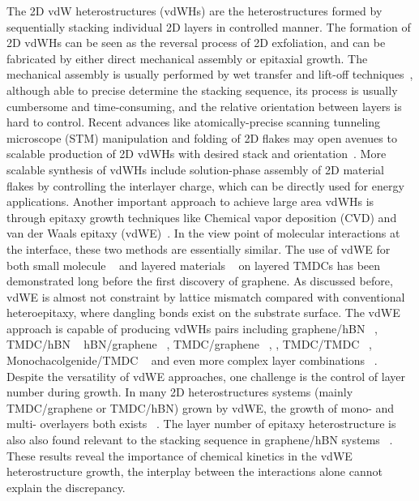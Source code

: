 The 2D vdW heterostructures (vdWHs) are the heterostructures formed by
sequentially stacking individual 2D layers in controlled manner. The
formation of 2D vdWHs can be seen as the reversal process of 2D
exfoliation, and can be fabricated by either direct mechanical
assembly or epitaxial growth.
%
The mechanical assembly is usually performed by wet transfer and
lift-off techniques~\cite{Novoselov_2016_vdW},
although able to precise determine the stacking
sequence, its process is usually cumbersome and time-consuming, and
the relative orientation between layers is hard to
control.
Recent advances like atomically-precise scanning tunneling microscope
(STM) manipulation and folding of 2D flakes may open avenues to
scalable production of 2D vdWHs with desired stack and
orientation~\cite{Chen_2019_STM_graphene}.
%
More scalable synthesis of vdWHs include solution-phase assembly of 2D
material flakes by controlling the interlayer charge, which can be
directly used for energy applications.
%
Another important approach to achieve large area vdWHs is through
epitaxy growth techniques like Chemical vapor deposition (CVD) and
van der Waals epitaxy (vdWE)~\cite{Novoselov_2016_vdW}. In the view point of
molecular interactions at the interface, these two methods are
essentially similar. The use of vdWE for both
small molecule ~\cite{Hara_1989_cupc_mos2_vdwe,Sakurai_1991_c60_mos2} and
layered materials
~\cite{Koma_1985_vdWE,Ueno_1990_vdWE,Ohuchi_1990_MoSe2_SnS2,Parkinson_1991_vdWE}
on layered TMDCs has been demonstrated long before the first discovery
of graphene. As discussed before, vdWE is almost not constraint by lattice mismatch compared with conventional heteroepitaxy,
where dangling bonds exist on the substrate surface.
%
The vdWE approach is capable of producing vdWHs pairs including
graphene/hBN ~\cite{Yang_2013_gr_hBN}, TMDC/hBN
~\cite{Yan_2015_MoS2_on_hBN,Wang_2015_cvd_MoS2_BN,
  Cattelan_2015_Ws2_hBN} hBN/graphene ~\cite{Lin_2014_vdW_solid},
TMDC/graphene
~\cite{Shi_2012_vdw_epi_MoS2_gr,McCreary_2014_MoS2_gr,Azizi_2015_Freevdw_Gr_TMDCs,Miwa_2015_MoS2_gr,Ago_2015_MoS2_Gr,Lin_2014_WS2_Gr,Lin_2015_Wse2_MoS2_gr},
, TMDC/TMDC ~\cite{Diaz_2015_MoTe2_MoSe2,Gong_2014_WS2_MoS2},
Monochacolgenide/TMDC
~\cite{Li_2016_GaSe_MoSe2_vdW,Zhang_2014_vdw_epi_SnS2_MoS2} and even
more complex layer combinations
~\cite{Lin_2015_Wse2_MoS2_gr,Alemayehu_2015_TMDC_vdw}.
% 
Despite the versatility of vdWE approaches, one challenge is the
control of layer number  during growth.
%
In many 2D heterostructures systems (mainly TMDC/graphene or TMDC/hBN)
grown by vdWE, the growth of mono- and multi- overlayers both exists
~\cite{Shi_2012_vdw_epi_MoS2_gr,Azizi_2015_Freevdw_Gr_TMDCs,Miwa_2015_MoS2_gr,Yan_2015_MoS2_on_hBN}.
%
The layer number of epitaxy heterostructure is also
also found relevant to the stacking sequence in graphene/hBN systems ~\cite{Wu_2015_Gr_hBN,Yang_2013_gr_hBN,Wu_2015_Gr_hBN}.
%
These results reveal the
importance of chemical kinetics in the vdWE heterostructure growth,
the interplay between the interactions alone cannot explain the
discrepancy.

